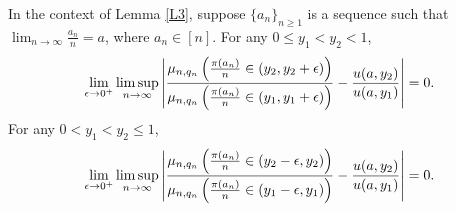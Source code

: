 \begin{lemma}\label{L7}
In the context of Lemma \ref{L3}, suppose $\{a_n\}_{n \ge 1}$ is a sequence such that $\lim_{n \to \infty} \frac{a_n}{n} = a$, where $a_n \in [n]$. 
For any $0 \le y_1 < y_2 < 1$,
\begin{equation}
\lim_{\epsilon \to 0^+} \limsup_{n \to \infty}
\left| \frac{\mu_{n, q_n} \left( \frac{\pi(a_n)}{n} \in (y_2, y_2 + \epsilon) \right)}{\mu_{n, q_n} \left( \frac{\pi(a_n)}{n} \in (y_1, y_1 + \epsilon) \right)}
- \frac{u(a, y_2)}{u(a, y_1)} \right| = 0.     \label{eq:L7a}
\end{equation}
For any $0 < y_1 < y_2 \le 1$,
\begin{equation}
\lim_{\epsilon \to 0^+} \limsup_{n \to \infty}
\left| \frac{\mu_{n, q_n} \left( \frac{\pi(a_n)}{n} \in (y_2 - \epsilon, y_2) \right)}{\mu_{n, q_n} \left( \frac{\pi(a_n)}{n} \in (y_1 - \epsilon, y_1) \right)}
- \frac{u(a, y_2)}{u(a, y_1)} \right| = 0.     \label{eq:L7b}
\end{equation}
\end{lemma}

